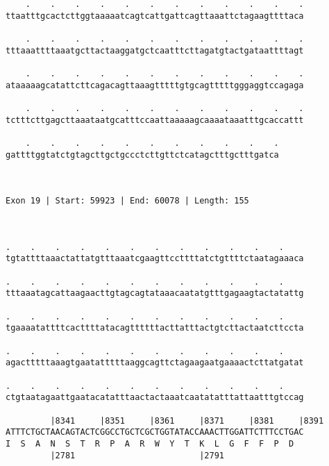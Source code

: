 \documentclass{article}
\begin{document}
\begin{Verbatim}
    .    .    .    .    .    .    .    .    .    .    .    .
ttaatttgcactcttggtaaaaatcagtcattgattcagttaaattctagaagttttaca
                                                            
    .    .    .    .    .    .    .    .    .    .    .    .
tttaaattttaaatgcttactaaggatgctcaatttcttagatgtactgataattttagt
                                                            
    .    .    .    .    .    .    .    .    .    .    .    .
ataaaaagcatattcttcagacagttaaagtttttgtgcagtttttgggaggtccagaga
                                                            
    .    .    .    .    .    .    .    .    .    .    .    .
tctttcttgagcttaaataatgcatttccaattaaaaagcaaaataaatttgcaccattt
                                                            
    .    .    .    .    .    .    .    .    .    .    .
gattttggtatctgtagcttgctgccctcttgttctcatagctttgctttgatca
                                                       
                                                       
 
Exon 19 | Start: 59923 | End: 60078 | Length: 155



.    .    .    .    .    .    .    .    .    .    .    .    
tgtattttaaactattatgtttaaatcgaagttccttttatctgttttctaatagaaaca
                                                            
.    .    .    .    .    .    .    .    .    .    .    .    
tttaaatagcattaagaacttgtagcagtataaacaatatgtttgagaagtactatattg
                                                            
.    .    .    .    .    .    .    .    .    .    .    .    
tgaaaatattttcacttttatacagttttttacttatttactgtcttactaatcttccta
                                                            
.    .    .    .    .    .    .    .    .    .    .    .    
agactttttaaagtgaatatttttaaggcagttctagaagaatgaaaactcttatgatat
                                                            
.    .    .    .    .    .    .    .    .    .    .    .    
ctgtaatagaattgaatacatatttaactactaaatcaatatatttattaatttgtccag
                                                            
         |8341     |8351     |8361     |8371     |8381     |8391
ATTTCTGCTAACAGTACTCGGCCTGCTCGCTGGTATACCAAACTTGGATTCTTTCCTGAC
I  S  A  N  S  T  R  P  A  R  W  Y  T  K  L  G  F  F  P  D  
         |2781                         |2791                
  

\end{Verbatim}
\end{document}
